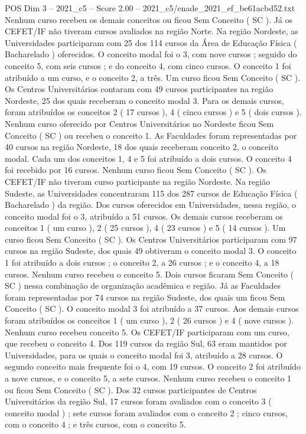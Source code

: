 \begin{textsample}{POS Dim 3 – 2021\_c5 – Score 2.00 – 2021\_c5/enade\_2021\_ef\_be61acbd52.txt}
Nenhum curso recebeu os demais conceitos ou ficou Sem Conceito ( SC ).
Já os CEFET/IF não tiveram cursos avaliados na região Norte.
Na região Nordeste, as Universidades participaram com 25 dos 114 cursos da Área de Educação Física ( Bacharelado ) oferecidos.
O conceito modal foi o 3, com nove cursos ; seguido do conceito 5, com seis cursos ; e do conceito 4, com cinco cursos.
O conceito 1 foi atribuído a um curso, e o conceito 2, a três.
Um curso ficou Sem Conceito ( SC ).
Os Centros Universitários contaram com 49 cursos participantes na região Nordeste, 25 dos quais receberam o conceito modal 3.
Para os demais cursos, foram atribuídos os conceitos 2 ( 17 cursos ), 4 ( cinco cursos ) e 5 ( dois cursos ).
Nenhum curso oferecido por Centros Universitários no Nordeste ficou Sem Conceito ( SC ) ou recebeu o conceito 1.
As Faculdades foram representadas por 40 cursos na região Nordeste, 18 dos quais receberam conceito 2, o conceito modal.
Cada um dos conceitos 1, 4 e 5 foi atribuído a dois cursos.
O conceito 4 foi recebido por 16 cursos.
Nenhum curso ficou Sem Conceito ( SC ).
Os CEFET/IF não tiveram curso participante na região Nordeste.
Na região Sudeste, as Universidades concentraram 115 dos 287 cursos de Educação Física ( Bacharelado ) da região.
Dos cursos oferecidos em Universidades, nessa região, o conceito modal foi o 3, atribuído a 51 cursos.
Os demais cursos receberam os conceitos 1 ( um curso ), 2 ( 25 cursos ), 4 ( 23 cursos ) e 5 ( 14 cursos ).
Um curso ficou Sem Conceito ( SC ).
Os Centros Universitários participaram com 97 cursos na região Sudeste, dos quais 49 obtiveram o conceito modal 3.
O conceito 1 foi atribuído a dois cursos ; o conceito 2, a 26 cursos ; e o conceito 4, a 18 cursos.
Nenhum curso recebeu o conceito 5.
Dois cursos ficaram Sem Conceito ( SC ) nessa combinação de organização acadêmica e região.
Já as Faculdades foram representadas por 74 cursos na região Sudeste, dos quais um ficou Sem Conceito ( SC ).
O conceito modal 3 foi atribuído a 37 cursos.
Aos demais cursos foram atribuídos os conceitos 1 ( um curso ), 2 ( 26 cursos ) e 4 ( nove cursos ).
Nenhum curso recebeu conceito 5.
Os CEFET/IF participaram com um curso, que recebeu o conceito 4.
Dos 119 cursos da região Sul, 63 eram mantidos por Universidades, para os quais o conceito modal foi 3, atribuído a 28 cursos.
O segundo conceito mais frequente foi o 4, com 19 cursos.
O conceito 2 foi atribuído a nove cursos, e o conceito 5, a sete cursos.
Nenhum curso recebeu o conceito 1 ou ficou Sem Conceito ( SC ).
Dos 32 cursos participantes de Centros Universitários da região Sul, 17 cursos foram avaliados com o conceito 3 ( conceito modal ) ; sete cursos foram avaliados com o conceito 2 ; cinco cursos, com o conceito 4 ; e três cursos, com o conceito 5.

\end{textsample}
